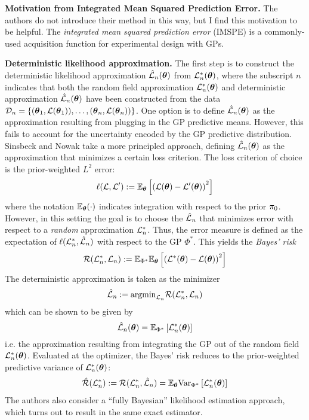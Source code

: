 \documentclass[12pt]{article}
\begin{document}
\bigskip
\noindent
\textbf{Motivation from Integrated Mean Squared Prediction Error.}
The authors do not introduce their method in this way, but I find this motivation to be helpful. The \textit{integrated mean squared prediction error} (IMSPE) is a commonly-used acquisition function for 
experimental design with GPs. 



\bigskip
\noindent
\textbf{Deterministic likelihood approximation.}
The first step is to construct the deterministic likelihood approximation $\hat{\mathcal{L}}_n(\boldsymbol{\theta})$ from 
$\mathcal{L}^*_n(\boldsymbol{\theta})$, where the subscript $n$ indicates that both the random field approximation $\mathcal{L}^*_n(\boldsymbol{\theta})$ and deterministic approximation $\hat{\mathcal{L}}_n(\boldsymbol{\theta})$ have been constructed from the data 
$\mathcal{D}_n = \left\{(\boldsymbol{\theta}_1, \mathcal{L}(\boldsymbol{\theta}_1)), \dots, (\boldsymbol{\theta}_n, \mathcal{L}(\boldsymbol{\theta}_n)) \right\}$. One option is to define $\hat{\mathcal{L}}_n(\boldsymbol{\theta})$ as the approximation resulting from plugging in the GP predictive 
means. However, this fails to account for the uncertainty encoded by the GP predictive distribution. Sinsbeck and Nowak take a more principled approach, defining $\hat{\mathcal{L}}_n(\boldsymbol{\theta})$ as the approximation that minimizes 
a certain loss criterion. The loss criterion of choice is the prior-weighted $L^2$ error:
\[\ell(\mathcal{L}, \mathcal{L}^\prime) := \mathbb{E}_{\boldsymbol{\theta}}\left[\left(\mathcal{L}(\boldsymbol{\theta}) - \mathcal{L}^\prime(\boldsymbol{\theta}) \right)^2 \right]\]
where the notation $\mathbb{E}_{\boldsymbol{\theta}}(\cdot)$ indicates integration with respect to the prior $\pi_0$. 
However, in this setting the goal is to choose the $\hat{\mathcal{L}}_n$ that minimizes error with respect to a \textit{random} approximation $\mathcal{L}_n^*$. Thus, the error measure is defined as the 
expectation of $\ell(\mathcal{L}^*_n, \hat{\mathcal{L}}_n)$ with respect to the GP $\Phi^*$. This yields the \textit{Bayes' risk}
\[\mathcal{R}(\mathcal{L}_n^*, \mathcal{L}_n) := \mathbb{E}_{\Phi^*} \mathbb{E}_{\boldsymbol{\theta}} \left[\left(\mathcal{L}^*(\boldsymbol{\theta}) - \mathcal{L}(\boldsymbol{\theta}) \right)^2 \right] \]
The deterministic approximation is taken as the minimizer  
\[\hat{\mathcal{L}}_n := \text{argmin}_{\mathcal{L}_n} \mathcal{R}(\mathcal{L}_n^*, \mathcal{L}_n) \]
which can be shown to be given by 
\[\hat{\mathcal{L}}_n(\boldsymbol{\theta}) = \mathbb{E}_{\Phi^*}\left[\mathcal{L}_n^*(\boldsymbol{\theta}) \right]\]
i.e. the approximation resulting from integrating the GP out of the random field $\mathcal{L}_n^*(\boldsymbol{\theta})$. Evaluated at the optimizer, the Bayes' risk reduces to the prior-weighted predictive variance 
of $\mathcal{L}_n^*(\boldsymbol{\theta})$: 
\begin{align}
\hat{\mathcal{R}}(\mathcal{L}_n^*) := \mathcal{R}(\mathcal{L}_n^*, \hat{\mathcal{L}}_n) = \mathbb{E}_{\boldsymbol{\theta}} \mathrm{Var}_{\Phi^*}\left[\mathcal{L}_n^*(\boldsymbol{\theta})\right] \label{Bayes_Risk}
\end{align}
The authors also consider a ``fully Bayesian'' likelihood estimation approach, which turns out to result in the same exact estimator. 
\end{document}
